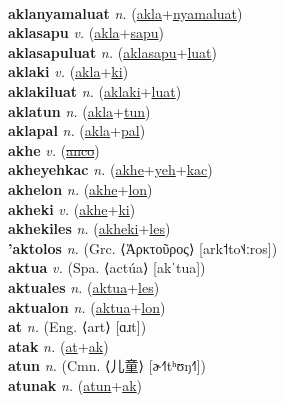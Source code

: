  \label{aklanyec} \\
\textbf{aklanyamaluat} \textit{n.} (\hyperref[akla]{akla}+\hyperref[nyamaluat]{nyamaluat})
 \label{aklanyamaluat} \\
\textbf{aklasapu} \textit{v.} (\hyperref[akla]{akla}+\hyperref[sapu]{sapu})
 \label{aklasapu} \\
\textbf{aklasapuluat} \textit{n.} (\hyperref[aklasapu]{aklasapu}+\hyperref[luat]{luat})
 \label{aklasapuluat} \\
\textbf{aklaki} \textit{v.} (\hyperref[akla]{akla}+\hyperref[ki]{ki})
 \label{aklaki} \\
\textbf{aklakiluat} \textit{n.} (\hyperref[aklaki]{aklaki}+\hyperref[luat]{luat})
 \label{aklakiluat} \\
\textbf{aklatun} \textit{n.} (\hyperref[akla]{akla}+\hyperref[tun]{tun})
 \label{aklatun} \\
\textbf{aklapal} \textit{n.} (\hyperref[akla]{akla}+\hyperref[pal]{pal})
 \label{aklapal} \\
\textbf{akhe} \textit{v.} (\hyperref[anco]{\sout{anco}})
 \label{akhe} \\
\textbf{akheyehkac} \textit{n.} (\hyperref[akhe]{akhe}+\hyperref[yeh]{yeh}+\hyperref[kac]{kac})
 \label{akheyehkac} \\
\textbf{akhelon} \textit{n.} (\hyperref[akhe]{akhe}+\hyperref[lon]{lon})
 \label{akhelon} \\
\textbf{akheki} \textit{v.} (\hyperref[akhe]{akhe}+\hyperref[ki]{ki})
 \label{akheki} \\
\textbf{akhekiles} \textit{n.} (\hyperref[akheki]{akheki}+\hyperref[les]{les})
 \label{akhekiles} \\
\textbf{'aktolos} \textit{n.} (Grc. ⟨Ἀρκτοῦρος⟩ [ark˦to˦˨ːros])
 \label{'aktolos} \\
\textbf{aktua} \textit{v.} (Spa. ⟨actúa⟩ [akˈtua])
 \label{aktua} \\
\textbf{aktuales} \textit{n.} (\hyperref[aktua]{aktua}+\hyperref[les]{les})
 \label{aktuales} \\
\textbf{aktualon} \textit{n.} (\hyperref[aktua]{aktua}+\hyperref[lon]{lon})
 \label{aktualon} \\
\textbf{at} \textit{n.} (Eng. ⟨art⟩ [ɑɹt])
 \label{at} \\
\textbf{atak} \textit{n.} (\hyperref[at]{at}+\hyperref[ak]{ak})
 \label{atak} \\
\textbf{atun} \textit{n.} (Cmn. ⟨儿童⟩ [ɚ˧˥tʰʊŋ˧˥])
 \label{atun} \\
\textbf{atunak} \textit{n.} (\hyperref[atun]{atun}+\hyperref[ak]{ak})
